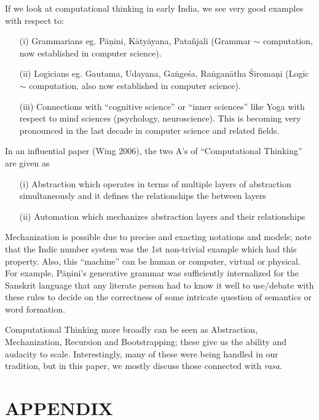 If we look at computational thinking in early India, we see very good examples with respect to:
\begin{itemize}
\item[(i)] Grammarians eg. Pāṇini, Kātyāyana, Patañjali (Grammar $\sim$ computation, now established in computer science).

\item[(ii)] Logicians eg. Gautama, Udayana, Gaṅgeśa, Raṅganātha Śiromaṇi (Logic $\sim$ computation, also now established in computer science).

\item[(iii)] Connections with “cognitive science” or “inner sciences” like Yoga with respect to mind sciences (psychology, neuroscience). This is becoming very pronounced in the last decade in computer science and related fields.
\end{itemize}

In an influential paper (Wing 2006), the two A’s of “Computational Thinking” are given as 
\begin{itemize}
\item[(i)] Abstraction which operates in terms of multiple layers of abstraction simultaneously and it defines the relationships the between layers

\item[(ii)] Automation which mechanizes abstraction layers and their relationships
\end{itemize}

Mechanization is possible due to precise and exacting notations and models; note that the Indic number system was the 1st non-trivial example which had this property. Also, this “machine” can be human or computer, virtual or physical. For example, Pāṇini’s generative grammar was sufficiently internalized for the Sanskrit language that any literate person had to know it well to use/debate with these rules to decide on the correctness of some intricate question of semantics or word formation.

Computational Thinking more broadly can be seen as Abstraction, Mechanization, Recursion and Bootstrapping; these give us the ability and audacity to scale. Interestingly, many of these were being handled in our tradition, but in this paper, we mostly discuss those connected with \textsl{rasa}.

\section{APPENDIX}\label{chap7-app2}

